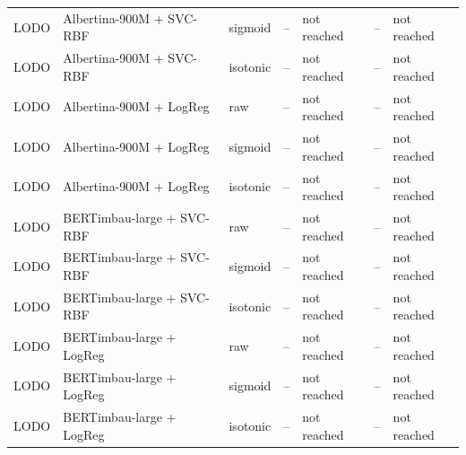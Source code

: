\begin{table}[t]
\begin{tabular}{lllrlrl}
LODO & Albertina-900M + SVC-RBF & sigmoid & -- & not reached & -- & not reached \\
LODO & Albertina-900M + SVC-RBF & isotonic & -- & not reached & -- & not reached \\
LODO & Albertina-900M + LogReg & raw & -- & not reached & -- & not reached \\
LODO & Albertina-900M + LogReg & sigmoid & -- & not reached & -- & not reached \\
LODO & Albertina-900M + LogReg & isotonic & -- & not reached & -- & not reached \\
LODO & BERTimbau-large + SVC-RBF & raw & -- & not reached & -- & not reached \\
LODO & BERTimbau-large + SVC-RBF & sigmoid & -- & not reached & -- & not reached \\
LODO & BERTimbau-large + SVC-RBF & isotonic & -- & not reached & -- & not reached \\
LODO & BERTimbau-large + LogReg & raw & -- & not reached & -- & not reached \\
LODO & BERTimbau-large + LogReg & sigmoid & -- & not reached & -- & not reached \\
LODO & BERTimbau-large + LogReg & isotonic & -- & not reached & -- & not reached \\
\bottomrule
\end{tabular}
\end{table}
